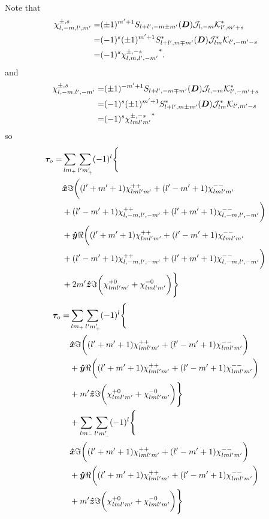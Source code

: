 \documentclass[aps,twocolumn,secnumarabic,balancelastpage,amsmath,amssymb,nofootinbib,floatfix]{revtex4-1}
\begin{document}
Note that
\begin{equation}
\begin{aligned}
\chi_{l,-m,l',m'}^{\pm,s} = &(\pm 1)^{m'+1}S_{l+l',-m\pm m'}(\bm D)\mathcal{J}_{l,-m} \mathcal{K}^*_{l',m'+s}\\
=&(-1)^s(\pm 1)^{m'+1}S^*_{l+l',m\mp m'}(\bm D)\mathcal{J}^*_{lm} \mathcal{K}_{l',-m'-s}\\
=&(-1)^s{\chi_{l,m,l',-m'}^{\pm,-s}}^*.
\end{aligned}
\label{eqn:chi}
\end{equation}
and
\begin{equation}
\begin{aligned}
\chi_{l,-m,l',-m'}^{\pm,s} = &(\pm 1)^{-m'+1}S_{l+l',-m\mp m'}(\bm D)\mathcal{J}_{l,-m} \mathcal{K}^*_{l',-m'+s}\\
=&(-1)^s(\pm 1)^{m'+1}S^*_{l+l',m\pm m'}(\bm D)\mathcal{J}^*_{lm} \mathcal{K}_{l',m'-s}\\
=&(-1)^s{\chi_{lml'm'}^{\pm,-s}}^*
\end{aligned}
\label{eqn:chi}
\end{equation}
so
\begin{equation*}
\begin{aligned}
\bm \tau_o = &\sum_{lm_+}\sum_{l'm'_+}(-1)^l\Bigg\{\\
&\bm{\hat x} \Im\bigg((l'+m'+1)\chi_{lml'm'}^{++} + (l'-m'+1)\chi_{lml'm'}^{--}\\
&+ (l'-m'+1)\chi_{l,-m,l',-m'}^{++} + (l'+m'+1)\chi_{l,-m,l',-m'}^{--}\bigg)\\
&+\bm{\hat y} \Re\bigg((l'+m'+1)\chi_{lml'm'}^{++} + (l'-m'+1)\chi_{lml'm'}^{--} \\
&+ (l'-m'+1)\chi_{l,-m,l',-m'}^{++} + (l'+m'+1)\chi_{l,-m,l',-m'}^{--}\bigg)\\
&+2m'\bm{\hat z}\Im\bigg(\chi_{lml'm'}^{+0}+\chi_{lml'm'}^{-0}\bigg)\Bigg\}
\end{aligned}
\end{equation*}
\begin{equation*}
\begin{aligned}
\bm \tau_o = &\sum_{lm_+}\sum_{l'm'_+}(-1)^l\Bigg\{\\
&\bm{\hat x} \Im\bigg((l'+m'+1)\chi_{lml'm'}^{++} + (l'-m'+1)\chi_{lml'm'}^{--}\bigg)\\
&+\bm{\hat y} \Re\bigg((l'+m'+1)\chi_{lml'm'}^{++} + (l'-m'+1)\chi_{lml'm'}^{--}\bigg)\\
&+m'\bm{\hat z}\Im\bigg(\chi_{lml'm'}^{+0}+\chi_{lml'm'}^{-0}\bigg)\Bigg\}\\
&+\sum_{lm_-}\sum_{l'm'_-}(-1)^l\Bigg\{\\
&\bm{\hat x} \Im\bigg((l'+m'+1)\chi_{lml'm'}^{++} + (l'-m'+1)\chi_{lml'm'}^{--}\bigg)\\
&+\bm{\hat y} \Re\bigg((l'+m'+1)\chi_{lml'm'}^{++} + (l'-m'+1)\chi_{lml'm'}^{--}\bigg)\\
&+m'\bm{\hat z}\Im\bigg(\chi_{lml'm'}^{+0}+\chi_{lml'm'}^{-0}\bigg)\Bigg\}
\end{aligned}
\end{equation*}
\end{document}
